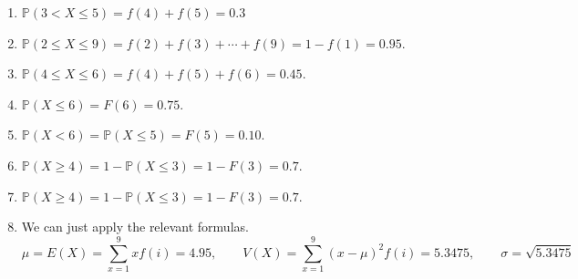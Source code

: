 \documentclass[../main.tex]{subfiles}
\begin{document}
\begin{exercise}
\begin{solution}
\begin{enumerate}
      \item \(\mathbb{P}(3   < X \le 5) = f(4) + f(5) = 0.3\)
      \item \(\mathbb{P}(2 \le X \le 9) = f(2) + f(3) + \cdots + f(9) = 1 - f(1) = 0.95\).
      \item \(\mathbb{P}(4 \le X \le 6) = f(4) + f(5) + f(6) = 0.45\).
      \item \(\mathbb{P}(X \le 6) = F(6) = 0.75\).
      \item \(\mathbb{P}(X < 6) = \mathbb{P}(X \le 5) = F(5) = 0.10\).
      \item \(\mathbb{P}(X \ge 4) = 1 - \mathbb{P}(X \le 3) = 1 - F(3) = 0.7\).
      \item \(\mathbb{P}(X \ge 4) = 1 - \mathbb{P}(X \le 3) = 1 - F(3) = 0.7\).
      \item We can just apply the relevant formulas.
        \[
          \mu = E(X) = \sum_{x=1}^{9} x f(i) = 4.95, \qquad
          V(X) = \sum_{x=1}^{9}(x - \mu)^{2}f(i) = 5.3475, \qquad
          \sigma = \sqrt{5.3475}
        \]
    \end{enumerate}
  \end{solution}

\end{exercise}
\end{document}
